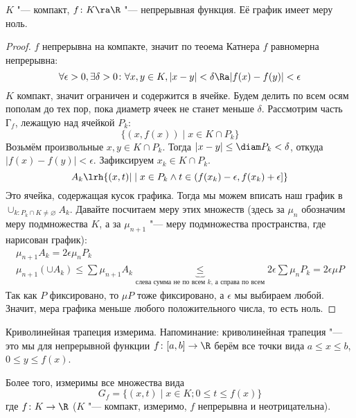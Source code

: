 \begin{theorem}
	$K$ "--- компакт, $f\colon K \ra \R$ "--- непрерывная функция.
	Её график имеет меру ноль.
\end{theorem}
\begin{proof}
	$f$ непрерывна на компакте, значит по теоема Катнера $f$ равномерна непрерывна:
	\[ \forall \epsilon > 0, \exists \delta > 0\colon \forall x, y \in K, |x - y| < \delta \Ra |f(x) - f(y)| < \epsilon \]
	$K$ компакт, значит ограничен и содержится в ячейке.
	Будем делить по всем осям пополам до тех пор, пока диаметр ячеек не станет меньше $\delta$.
	Рассмотрим часть $Г_f$, лежащую над ячейкой $P_k$:
	\[ \{(x, f(x)) \mid x \in K \cap P_k \} \]
	Возьмём произвольные $x, y \in K \cap P_k$.
	Тогда $|x - y| \le \diam P_k < \delta$, откуда $|f(x) - f(y)| < \epsilon$.
	Зафиксируем $x_k \in K \cap P_k$.
	\[ A_k \lrh \{(x, t) | \mid x \in P_k \land t \in (f(x_k) - \epsilon, f(x_k) + \epsilon] \} \]
	Это ячейка, содержащая кусок графика.
	Тогда мы можем вписать наш график в $\cup_{k \colon P_k \cap K \neq \varnothing} A_k$.
	Давайте посчитаем меру этих множеств (здесь за $\mu_n$ обозначим меру подмножества $K$, а за $\mu_{n+1}$ "--- меру подмножества пространства, где нарисован график):
	\begin{gather*}
	  \mu_{n+1} A_k = 2\epsilon \mu_n P_k \\
	  \mu_{n+1} (\cup A_k) \le \sum \mu_{n+1} A_k \underbrace{\le}_{\text{слева сумма не по всем $k$, а справа по всем}} 2\epsilon \sum \mu_n P_k = 2\epsilon \mu P
	\end{gather*}
	Так как $P$ фиксировано, то $\mu P$ тоже фиксировано, а $\epsilon$ мы выбираем любой.
	Значит, мера графика меньше любого положительного числа, то есть ноль.
\end{proof}
\begin{conseq}
	Криволинейная трапеция  измерима.
	Напоминание: криволинейная трапеция "--- это мы для непрерывной
	функции $f\colon [a, b] \to \R$ берём все точки вида $a \le x \le b$, $0 \le y \le f(x)$.

	Более того, измеримы все множества вида
	\[ G_f = \{(x, t) \mid x \in K; 0 \le t \le f(x)\} \]
	где	$f \colon K \to \R$ ($K$ "--- компакт, измеримо, $f$ непрерывна и неотрицательна).
\end{conseq}
